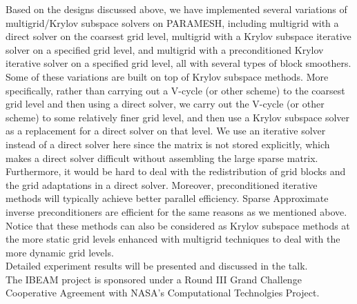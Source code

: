 \documentclass{report}
\begin{document}
Based on the designs discussed above, we have implemented several variations of
multigrid/Krylov subspace solvers on PARAMESH, including multigrid with a
direct solver on
the coarsest grid level, multigrid with a Krylov subspace iterative
solver on a specified grid level, and multigrid with a
preconditioned Krylov iterative solver on a specified grid level,
all with several types of block smoothers.
Some of these variations are built on top of Krylov subspace methods.
More specifically, rather than carrying out a V-cycle (or other scheme) to the coarsest
grid level and then using a direct solver, we carry out the V-cycle (or
other scheme) to some
relatively finer grid level, and then use a Krylov subspace solver as a
replacement for a direct solver on that level. We use an iterative
solver instead of a direct solver here since the matrix is not
stored explicitly, which makes a direct solver difficult without
assembling the large sparse matrix. Furthermore, it would be hard to deal with the
redistribution of grid blocks and the grid adaptations in a direct solver.
Moreover, preconditioned iterative
methods will typically achieve better parallel efficiency.
Sparse Approximate inverse preconditioners are efficient for the same
reasons as we mentioned above. Notice that these methods can also be
considered as Krylov subspace methods at the more static grid levels enhanced
with multigrid techniques to deal with the more dynamic grid levels.\\

Detailed experiment results will be presented and
discussed in the talk.\\

The IBEAM project is sponsored under a Round III Grand Challenge
Cooperative Agreement with NASA's Computational Technolgies
Project.
\end{document}
